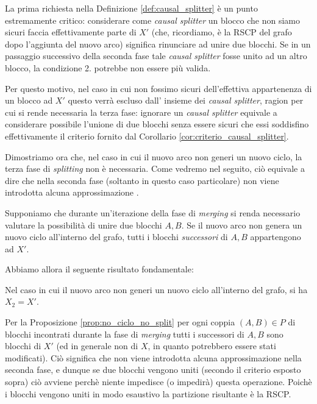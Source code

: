 La prima richiesta nella Definizione \ref{def:causal_splitter} è un punto estremamente critico: considerare come \emph{causal splitter} un blocco che non siamo sicuri faccia effettivamente parte di $X'$ (che, ricordiamo, è la RSCP del grafo dopo l'aggiunta del nuovo arco) significa rinunciare ad unire due blocchi. Se in un passaggio successivo della seconda fase tale \emph{causal splitter} fosse unito ad un altro blocco, la condizione 2. potrebbe non essere più valida.

Per questo motivo, nel caso in cui non fossimo sicuri dell'effettiva appartenenza di un blocco ad $X'$ questo verrà escluso dall' insieme dei \emph{causal splitter}, ragion per cui si rende necessaria la terza fase: ignorare un \emph{causal splitter} equivale a considerare possibile l'unione di due blocchi senza essere sicuri che essi soddisfino effettivamente il criterio fornito dal Corollario \ref{cor:criterio_causal_splitter}.

Dimostriamo ora che, nel caso in cui il nuovo arco non generi un nuovo ciclo, la terza fase di \emph{splitting} non è necessaria. Come vedremo nel seguito, ciò equivale a dire che nella seconda fase (soltanto in questo caso particolare) non viene introdotta alcuna approssimazione \cite{saha}.

\begin{proposition}
    \label{prop:no_ciclo_no_split}
    Supponiamo che durante un'iterazione della fase di \emph{merging} si renda necessario valutare la possibilità di unire due blocchi $A,B$. Se il nuovo arco non genera un nuovo ciclo all'interno del grafo, tutti i blocchi \emph{successori} di $A,B$ appartengono ad $X'$.
\end{proposition}

Abbiamo allora il seguente risultato fondamentale:

\begin{proposition}
    Nel caso in cui il nuovo arco non generi un nuovo ciclo all'interno del grafo, si ha $X_2 = X'$.
\end{proposition}
\begin{proof2}
    Per la Proposizione \ref{prop:no_ciclo_no_split} per ogni coppia $(A,B) \in P$ di blocchi incontrati durante la fase di \emph{merging} tutti i successori di $A,B$ sono blocchi di $X'$ (ed in generale non di $X$, in quanto potrebbero essere stati modificati). Ciò significa che non viene introdotta alcuna approssimazione nella seconda fase, e dunque se due blocchi vengono uniti (secondo il criterio esposto sopra) ciò avviene perchè niente impedisce (o impedirà) questa operazione. Poichè i blocchi vengono uniti in modo esaustivo la partizione risultante è la RSCP.
\end{proof2}

